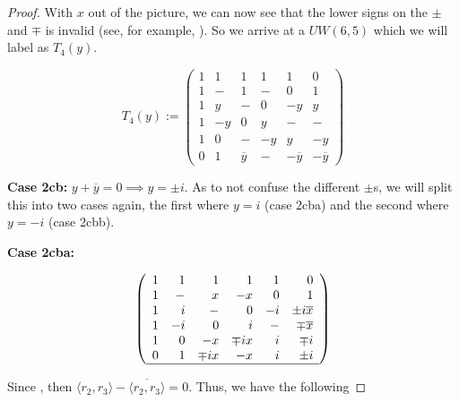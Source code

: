 \begin{lemma}
\begin{proof}
With $x$ out of the picture, we can now see that the lower signs on the $\pm$ and $\mp$ is invalid (see, for example, ). So we arrive at a $UW(6,5)$ which we will label as $T_4(y)$.

\begin{equation}  \label{mat:T_4}
T_4(y) := \left(\begin{array}{rrrrrr}
                1 &  1 & 1  &  1 &  1 & 0 \\
                1 &  - & 1  & - &  0 & 1 \\
                1 &  y & -  &  0 & -y & y \\
                1 & -y & 0  &  y &  - & - \\
                1 &  0 & - &  -y &  y & -y \\
                0 &  1 & \overline{y}  & - & -\overline{y} & -\overline{y}
               \end{array}\right)
\end{equation}

{\bf Case 2cb:} $y+\overline{y}=0 \implies y = \pm i$. As to not confuse the different $\pm$s, we will split this into two cases again, the first where $y=i$ (case 2cba) and the second where $y=-i$ (case 2cbb).

{\bf Case 2cba:}

\begin{equation} \label{mat:2cba-1}
 \left(\begin{array}{rrrrrr}
                1 &  1 & 1  &  1 &  1 & 0 \\
                1 &  - & x  & -x &  0 & 1 \\
                1 &  i & -  &  0 & -i & \pm i\overline{x} \\
                1 & -i & 0  &  i &  - & \mp\overline{x} \\
                1 &  0 & -x &  \mp ix &  i & \mp i \\
                0 &  1 & \mp ix  & -x & i & \pm i \\ \hline
              \end{array}\right)
\end{equation}

Since , then $\langle r_2 , r_3 \rangle - \overline{\langle r_2 , r_3 \rangle} = 0$. Thus, we have the following


\end{proof}
\end{lemma}
